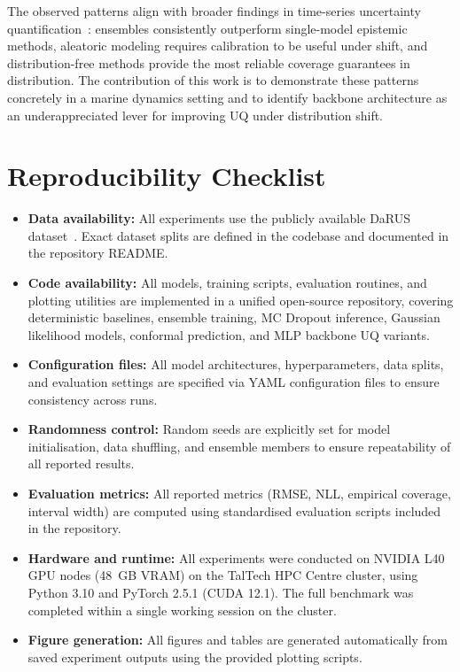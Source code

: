 \documentclass[a4paper,fleqn]{cas-sc}
\begin{document}
The observed patterns align with broader findings in time-series uncertainty quantification~\cite{foldesi2023comparison,ovadia2019can}: ensembles consistently outperform single-model epistemic methods, aleatoric modeling requires calibration to be useful under shift, and distribution-free methods provide the most reliable coverage guarantees in distribution. The contribution of this work is to demonstrate these patterns concretely in a marine dynamics setting and to identify backbone architecture as an underappreciated lever for improving UQ under distribution shift.

\section{Reproducibility Checklist}

\begin{itemize}
    \item \textbf{Data availability:} All experiments use the publicly available DaRUS dataset~\cite{baier2022darus}. Exact dataset splits are defined in the codebase and documented in the repository README.

    \item \textbf{Code availability:} All models, training scripts, evaluation routines, and plotting utilities are implemented in a unified open-source repository, covering deterministic baselines, ensemble training, MC Dropout inference, Gaussian likelihood models, conformal prediction, and MLP backbone UQ variants.

    \item \textbf{Configuration files:} All model architectures, hyperparameters, data splits, and evaluation settings are specified via YAML configuration files to ensure consistency across runs.

    \item \textbf{Randomness control:} Random seeds are explicitly set for model initialisation, data shuffling, and ensemble members to ensure repeatability of all reported results.

    \item \textbf{Evaluation metrics:} All reported metrics (RMSE, NLL, empirical coverage, interval width) are computed using standardised evaluation scripts included in the repository.

    \item \textbf{Hardware and runtime:} All experiments were conducted on NVIDIA L40 GPU nodes (48~GB VRAM) on the TalTech HPC Centre cluster, using Python 3.10 and PyTorch 2.5.1 (CUDA 12.1). The full benchmark was completed within a single working session on the cluster.

    \item \textbf{Figure generation:} All figures and tables are generated automatically from saved experiment outputs using the provided plotting scripts.
\end{itemize}
\end{document}
